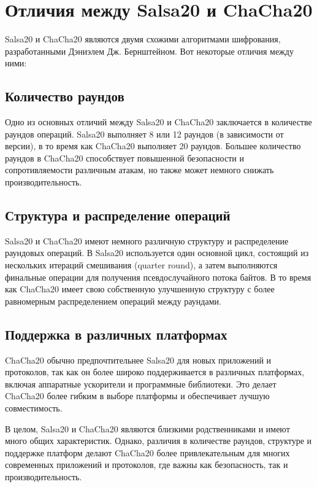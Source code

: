 \documentclass[12pt]{article}
\begin{document}
    \newpage


    \newpage

    \section{Отличия между Salsa20 и ChaCha20}

    Salsa20 и ChaCha20 являются двумя схожими алгоритмами шифрования, разработанными Дэниэлем Дж. Бернштейном. Вот некоторые отличия между ними:

    \subsection{Количество раундов}

    Одно из основных отличий между Salsa20 и ChaCha20 заключается в количестве раундов операций.
    Salsa20 выполняет 8 или 12 раундов (в зависимости от версии), в то время как ChaCha20 выполняет 20 раундов.
    Большее количество раундов в ChaCha20 способствует повышенной безопасности и сопротивляемости различным атакам, но также может немного снижать производительность.

    \subsection{Структура и распределение операций}

    Salsa20 и ChaCha20 имеют немного различную структуру и распределение раундовых операций.
    В Salsa20 используется один основной цикл, состоящий из нескольких итераций смешивания (quarter round), а затем выполняются финальные операции для получения псевдослучайного потока байтов. В то время как ChaCha20 имеет свою собственную улучшенную структуру с более равномерным распределением операций между раундами.

    \subsection{Поддержка в различных платформах}

    ChaCha20 обычно предпочтительнее Salsa20 для новых приложений и протоколов, так как он более широко поддерживается в различных платформах, включая аппаратные ускорители и программные библиотеки. Это делает ChaCha20 более гибким в выборе платформы и обеспечивает лучшую совместимость.

    В целом, Salsa20 и ChaCha20 являются близкими родственниками и имеют много общих характеристик.
    Однако, различия в количестве раундов, структуре и поддержке платформ делают ChaCha20 более привлекательным для многих современных приложений и протоколов, где важны как безопасность, так и производительность.
\end{document}
